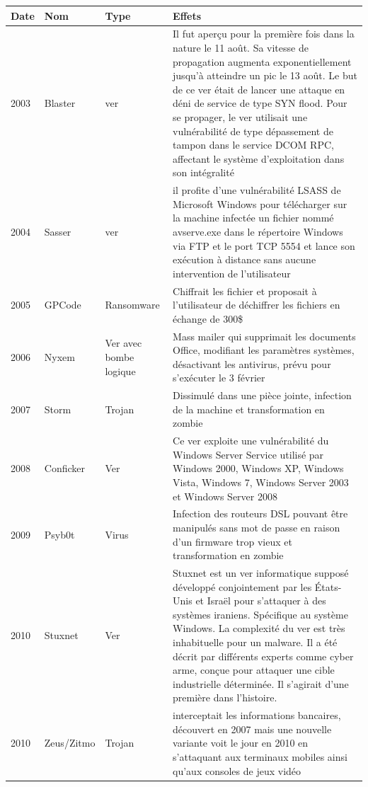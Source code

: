 \begin{table}[H]
\begin{tabular}{|p{1.5cm}|p{2cm}|p{2cm}|p{9cm}|}
\hline \textbf{Date} &  \textbf{Nom} & \textbf{Type} & \textbf{Effets} \\
\hline 2003& Blaster & ver & Il fut aperçu pour la première fois dans la nature le 11 août. Sa vitesse de propagation augmenta exponentiellement jusqu'à atteindre un pic le 13 août. Le but de ce ver était de lancer une attaque en déni de service de type SYN flood. Pour se propager, le ver utilisait une vulnérabilité de type dépassement de tampon dans le service DCOM RPC, affectant le système d'exploitation dans son intégralité \\
\hline 2004 & Sasser & ver & il profite d'une vulnérabilité LSASS de Microsoft Windows pour télécharger sur la machine infectée un fichier nommé avserve.exe dans le répertoire Windows via FTP et le port TCP 5554 et lance son exécution à distance sans aucune intervention de l'utilisateur\\
\hline 2005 & GPCode  & Ransomware & Chiffrait les fichier et proposait à l'utilisateur de déchiffrer les fichiers en échange de 300\$\\
\hline 2006 & Nyxem & Ver avec bombe logique & Mass mailer qui supprimait les documents  Office, modifiant les paramètres systèmes, désactivant les antivirus, prévu pour s'exécuter le 3 février \\
\hline 2007 & Storm & Trojan & Dissimulé dans une pièce jointe, infection de la machine et transformation en zombie \\
\hline 2008 & Conficker& Ver & Ce ver exploite une vulnérabilité du Windows Server Service utilisé par Windows 2000, Windows XP, Windows Vista, Windows 7, Windows Server 2003 et Windows Server 2008\\
\hline 2009 & Psyb0t & Virus & Infection des routeurs DSL pouvant être manipulés sans mot de passe en raison d'un firmware trop vieux et transformation en zombie \\
\hline 2010 & Stuxnet & Ver & Stuxnet est un ver informatique supposé développé conjointement par les États-Unis et Israël pour s'attaquer à des systèmes iraniens. Spécifique au système Windows. La complexité du ver est très inhabituelle pour un malware. Il a été décrit par différents experts comme cyber arme, conçue pour attaquer une cible industrielle déterminée. Il s'agirait d'une première dans l'histoire. \\
\hline 2010 & Zeus/Zitmo & Trojan & interceptait les informations bancaires, découvert en 2007 mais une nouvelle variante voit le jour en 2010 en s'attaquant aux terminaux mobiles ainsi qu'aux consoles de jeux vidéo \\

\end{tabular}
\end{table}
